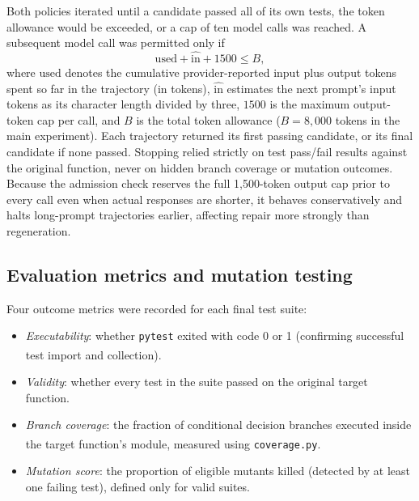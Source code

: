 \documentclass[11pt,a4paper]{article}
\newcommand{\ysjcite}[1]{\,\textsuperscript{\cite{#1}}}
\begin{document}
Both policies iterated until a candidate passed all of its own tests, the token allowance would be exceeded, or a cap of ten model calls was reached. A subsequent model call was permitted only if
\begin{equation}
  \text{used} + \widehat{\text{in}} + 1500 \le B,
\end{equation}
where $\text{used}$ denotes the cumulative provider-reported input plus output tokens spent so far in the trajectory (in tokens), $\widehat{\text{in}}$ estimates the next prompt's input tokens as its character length divided by three, $1500$ is the maximum output-token cap per call, and $B$ is the total token allowance ($B = 8{,}000$ tokens in the main experiment). Each trajectory returned its first passing candidate, or its final candidate if none passed. Stopping relied strictly on test pass/fail results against the original function, never on hidden branch coverage or mutation outcomes. Because the admission check reserves the full 1{,}500-token output cap prior to every call even when actual responses are shorter, it behaves conservatively and halts long-prompt trajectories earlier, affecting repair more strongly than regeneration.

\subsection{Evaluation metrics and mutation testing}
Four outcome metrics were recorded for each final test suite:
\begin{itemize}[leftmargin=*,nosep]
  \item \emph{Executability}: whether \texttt{pytest} exited with code 0 or 1 (confirming successful test import and collection).\ysjcite{pytest}
  \item \emph{Validity}: whether every test in the suite passed on the original target function.
  \item \emph{Branch coverage}: the fraction of conditional decision branches executed inside the target function's module, measured using \texttt{coverage.py}.\ysjcite{coveragepy}
  \item \emph{Mutation score}: the proportion of eligible mutants killed (detected by at least one failing test), defined only for valid suites.
\end{itemize}
\end{document}
